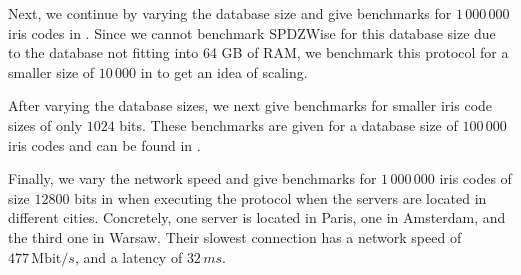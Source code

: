 \documentclass[a4paper,11pt,
]{article}
\begin{document}
Next, we continue by varying the database size and give benchmarks for $1\,000\,000$ iris codes in . Since we cannot benchmark SPDZWise for this database size due to the database not fitting into 64 GB of RAM, we benchmark this protocol for a smaller size of $10\,000$ in  to get an idea of scaling.

After varying the database sizes, we next give benchmarks for smaller iris code sizes of only $1024$ bits. These benchmarks are given for a database size of $100\,000$ iris codes and can be found in .

Finally, we vary the network speed and give benchmarks for $1\,000\,000$ iris codes of size $12800$ bits in  when executing the protocol when the servers are located in different cities. Concretely, one server is located in Paris, one in Amsterdam, and the third one in Warsaw. Their slowest connection has a network speed of $477\,\text{Mbit}/s$, and a latency of $32\,ms$.
\end{document}
